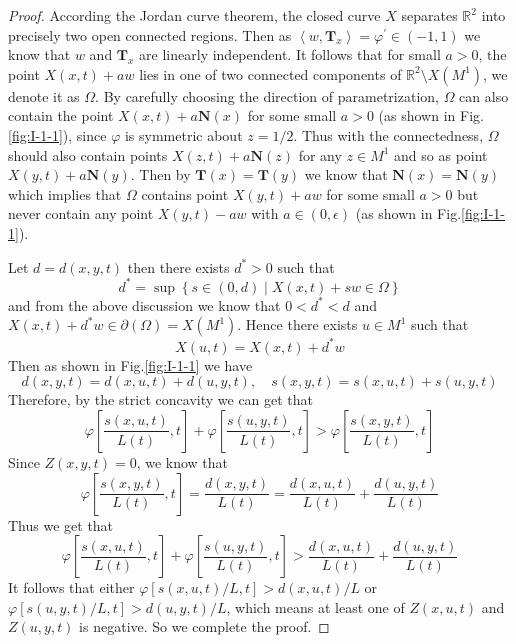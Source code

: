 \begin{proof}
    According the Jordan curve theorem, the closed curve $X$ separates $\mathbb{R}^2$ into precisely two open connected regions. Then as $\left<w,\mathbf{T}_x\right>=\varphi^\prime\in (-1,1)$ we know that $w$ and $\mathbf{T}_x$ are linearly independent. It follows that for small $a>0$, the point $X(x,t)+aw$ lies in one of two connected components of $\mathbb{R}^2\setminus X(M^1)$, we denote it as $\Omega$. By carefully choosing the direction of parametrization, $\Omega$ can also contain the point $X(x,t)+a\mathbf{N}(x)$ for some small $a>0$ (as shown in Fig.\ref{fig:I-1-1}), since $\varphi$ is symmetric about $z=1/2$. Thus with the connectedness, $\Omega$ should also contain points $X(z,t)+a\mathbf{N}(z)$ for any $z\in M^1$ and so as point $X(y,t)+a\mathbf{N}(y)$. Then by $\mathbf{T}(x)=\mathbf{T}(y)$ we know that $\mathbf{N}(x)=\mathbf{N}(y)$ which implies that $\Omega$ contains point $X(y,t)+aw$ for some small $a>0$ but never contain any point $X(y,t)-aw$ with $a\in (0,\epsilon)$ (as shown in Fig.\ref{fig:I-1-1}).

    Let $d=d(x,y,t)$ then there exists $d^*>0$ such that
    \begin{equation*}
        d^*=\sup{\left\{s\in(0,d)\mid X(x,t)+sw\in\Omega\right\}}
    \end{equation*}
    and from the above discussion we know that $0<d^*<d$ and $X(x,t)+d^* w\in\partial(\Omega)=X(M^1)$. Hence there exists $u\in M^1$ such that
    \begin{equation*}
        X(u,t)=X(x,t)+d^* w
    \end{equation*}
    Then as shown in Fig.\ref{fig:I-1-1} we have
    \begin{equation*}
        d(x,y,t)=d(x,u,t)+d(u,y,t),\quad s(x,y,t)=s(x,u,t)+s(u,y,t)
    \end{equation*}
    Therefore, by the strict concavity we can get that
    \begin{equation*}
        \varphi\left[\frac{s(x,u,t)}{L(t)},t\right]+\varphi\left[\frac{s(u,y,t)}{L(t)},t\right]>\varphi\left[\frac{s(x,y,t)}{L(t)},t\right]
    \end{equation*}
    Since $Z(x,y,t)=0$, we know that
    \begin{equation*}
        \varphi\left[\frac{s(x,y,t)}{L(t)},t\right]=\frac{d(x,y,t)}{L(t)}=\frac{d(x,u,t)}{L(t)}+\frac{d(u,y,t)}{L(t)}
    \end{equation*}
    Thus we get that
    \begin{equation*}
        \varphi\left[\frac{s(x,u,t)}{L(t)},t\right]+\varphi\left[\frac{s(u,y,t)}{L(t)},t\right]>\frac{d(x,u,t)}{L(t)}+\frac{d(u,y,t)}{L(t)}
    \end{equation*}
    It follows that either $\varphi[s(x,u,t)/L,t]>d(x,u,t)/L$ or $\varphi[s(u,y,t)/L,t]>d(u,y,t)/L$, which means at least one of $Z(x,u,t)$ and $Z(u,y,t)$ is negative. So we complete the proof.
\end{proof}

